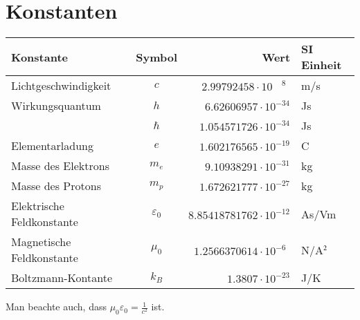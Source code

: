 \chapter{Konstanten\label{chapter:konstanten}}
\rhead{}
\begin{center}
\begin{tabular}{lcrl}
\hline
Konstante&Symbol&Wert&SI Einheit\\
\hline
Lichtgeschwindigkeit     &$c$            &$2.99792458\cdot 10^{\phantom{-}8\phantom{0}}$&m/s\\
Wirkungsquantum          &$h$            &$6.62606957\cdot 10^{-34}$   &Js\\
                         &$\hbar$        &$1.054571726\cdot 10^{-34}$  &Js\\
Elementarladung          &$e$            &$1.602176565\cdot 10^{-19}$  &C \\
Masse des Elektrons      &$m_e$          &$9.10938291\cdot 10^{-31}$   &kg\\
Masse des Protons        &$m_p$          &$1.672621777\cdot 10^{-27}$  &kg\\
Elektrische Feldkonstante&$\varepsilon_0$&$8.85418781762\cdot 10^{-12}$&As/Vm\\
Magnetische Feldkonstante&$\mu_0$        &$1.2566370614\cdot 10^{-6\phantom{0}}$  &N/A$\mathstrut^2$\\
Boltzmann-Kontante       &$k_B$          &$1.3807\cdot 10^{-23}$&J/K\\
\hline
\end{tabular}
\end{center}
Man beachte auch, dass $\displaystyle \mu_0\varepsilon_0=\frac1{c^2}$ ist.
